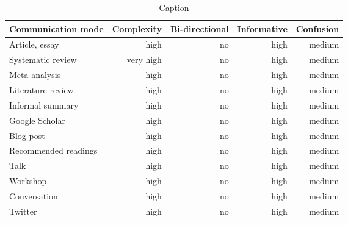 \begin{table*}\centering
{}
\begin{tabular}{@{}lrrrr@{}}\toprule
Communication mode & Complexity & Bi-directional & Informative  & Confusion
\\\midrule
Article, essay      & high & no & high & medium  \\
Systematic review   & very high & no & high & medium\\
Meta analysis       & high & no & high & medium\\
Literature review   & high & no & high & medium\\
Informal summary    & high & no & high & medium\\
Google Scholar      & high & no & high & medium\\
Blog post           & high & no & high & medium\\
Recommended readings& high & no & high & medium\\
Talk                & high & no & high & medium\\
Workshop            & high & no & high & medium\\
Conversation        & high & no & high & medium\\
Twitter             & high & no & high & medium\\
\bottomrule
\end{tabular}
\caption{Caption}
\end{table*}